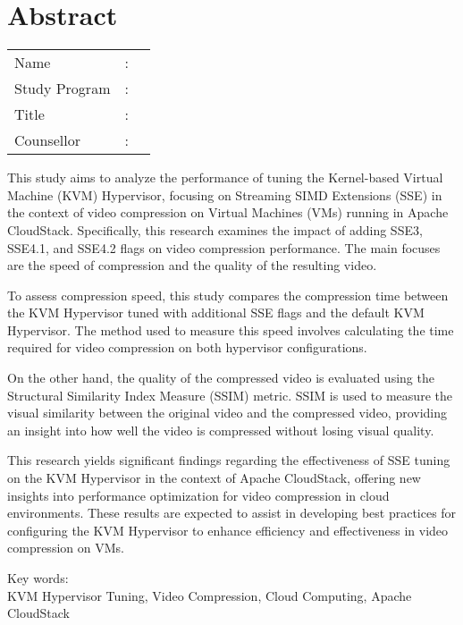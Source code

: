 %
%
%

\chapter*{Abstract}

\vspace*{0.2cm}
{
	\setlength{\parindent}{0pt}
	
	\begin{tabular}{@{}l l p{10cm}}
		Name&: & \penulis \\
		Study Program&: & \program \\
		Title&: & \judulInggris \\
		Counsellor&: & \pembimbing \\
	\end{tabular}

	\bigskip
	\bigskip

	This study aims to analyze the performance of tuning the Kernel-based Virtual Machine (KVM) Hypervisor, focusing on Streaming SIMD Extensions (SSE) in the context of video compression on Virtual Machines (VMs) running in Apache CloudStack. Specifically, this research examines the impact of adding SSE3, SSE4.1, and SSE4.2 flags on video compression performance. The main focuses are the speed of compression and the quality of the resulting video.
	
	To assess compression speed, this study compares the compression time between the KVM Hypervisor tuned with additional SSE flags and the default KVM Hypervisor. The method used to measure this speed involves calculating the time required for video compression on both hypervisor configurations.
	
	On the other hand, the quality of the compressed video is evaluated using the Structural Similarity Index Measure (SSIM) metric. SSIM is used to measure the visual similarity between the original video and the compressed video, providing an insight into how well the video is compressed without losing visual quality.
	
	This research yields significant findings regarding the effectiveness of SSE tuning on the KVM Hypervisor in the context of Apache CloudStack, offering new insights into performance optimization for video compression in cloud environments. These results are expected to assist in developing best practices for configuring the KVM Hypervisor to enhance efficiency and effectiveness in video compression on VMs.

	\bigskip

	Key words:\\
	KVM Hypervisor Tuning, Video Compression, Cloud Computing, Apache CloudStack
}

\newpage